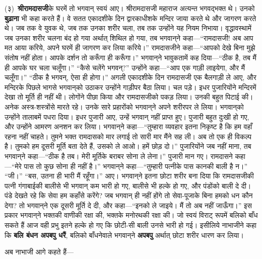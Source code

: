 \begin{sloppypar}\justifying{}
(३)~\textbf{श्रीरामदासजी}के घरमें तो भगवान् स्वयं आए। श्रीरामदासजी महाराज अत्यन्त भगवद्भक्त थे। उनको \textbf{बुढ़ाना} भी कहा करते हैं। वे सतत एकादशीके दिन द्वारकाधीशके मन्दिर जाया करते थे और जागरण करते थे। जब तक वे युवक थे, जब तक उनका शरीर चला, तब तक उन्होंने यह नियम निभाया। वृद्धावस्थामें जब उनका शरीर चलना बंद हो गया अर्थात् शिथिल हो गया, तब भगवान्‌ने कहा—“रामदासजी! अब आप मत आया करिये, अपने घरमें ही जागरण कर लिया करिये।” रामदासजीने कहा—“आपको देखे बिना मुझे संतोष नहीं होता। आपके दर्शन तो करूँगा ही करूँगा।” भगवान्‌ने भावुकतामें कह दिया—“ठीक है, तब मैं ही आपके घर चला चलूँगा।” “कैसे चलेंगे भगवन्?” उन्होंने कहा—“आप एक गाड़ी लाइयेगा, और मैं चलूँगा।” “ठीक है भगवन्, ऐसा ही होगा।” अगली एकादशीके दिन रामदासजी एक बैलगाड़ी ले आए, और मन्दिरके पिछले भागसे भगवान्‌को उठाकर उन्होंने गाड़ीपर बैठा लिया। चल पड़े। इधर पुजारियोंने मन्दिरमें देखा तो मूर्ति ही नहीं थी। लोगोंने पीछा किया और रामदासजीको पकड़ लिया। उनकी बहुत पिटाई की। अनेक अस्त्र-शस्त्रोंसे मारते रहे। उनके सारे प्रहारोंको भगवान्‌ने अपने शरीरपर ले लिया। भगवान्‌को उन्होंने तालाबमें पधरा दिया। इधर पुजारी आए, उन्हें भगवान् नहीं प्राप्त हुए। पुजारी बहुत दुःखी हो गए, और उन्होंने आमरण अनशन कर लिया। भगवान्‌ने कहा—“तुम्हारा व्यवहार इतना निकृष्ट है कि हम वहाँ रहना नहीं चाहते। तुमने भक्त रामदासको मार लगाई तो सारी मार मैंने सह ली। अब तो एक ही विकल्प है। तुमको हम दूसरी मूर्ति बता देते हैं, उसको ले आओ। हमें छोड़ दो।” पुजारियोंने जब नहीं माना, तब भगवान्‌ने कहा—“ठीक है तब। मेरी मूर्तिके बराबर सोना ले लेना।” पुजारी मान गए। रामदासने कहा—“मेरे पास तो कुछ सोना ही नहीं है।” भगवान्‌ने कहा—“तुम्हारी पत्नीके पास कानकी बाली है न।” “जी।” “बस, उतना ही भारी मैं रहूँगा।” आए। भगवान्‌ने इतना छोटा शरीर बना दिया कि रामदासजीकी पत्नी गंगाबाईकी बालीसे भी भगवान् कम भारी हो गए, बालीसे भी हल्के हो गए, और पंडोंको बाली दे दी। पंडे देखते रहे कि सेवा हम कहाँसे करेंगे? जब भगवान् ही नहीं होंगे तो सेवा-पूजाके बिना हमको धन कौन देगा? तो भगवान्‌ने एक दूसरी मूर्ति दे दी, और कहा—“इनको ले जाइये। मैं तो अब नहीं जाऊँगा।” इस प्रकार भगवान्‌ने भक्तकी वाणीकी रक्षा की, भक्तके मनोरथकी रक्षा की। जो स्वयं विराट् रूपमें बलिको बाँध सकते हैं आज वही प्रभु इतने हल्के हो गए कि छोटी-सी बाली उनसे भारी हो गई। इसीलिये नाभाजीने कहा कि \textbf{बलि बंधन अपबपु धरैं}, बलिको बाँधनेवाले भगवान्‌ने \textbf{अपबपु} अर्थात् छोटा शरीर धारण कर लिया।
\end{sloppypar}
\begin{sloppypar}\justifying{}
अब नाभाजी आगे कहते हैं—
\end{sloppypar}

